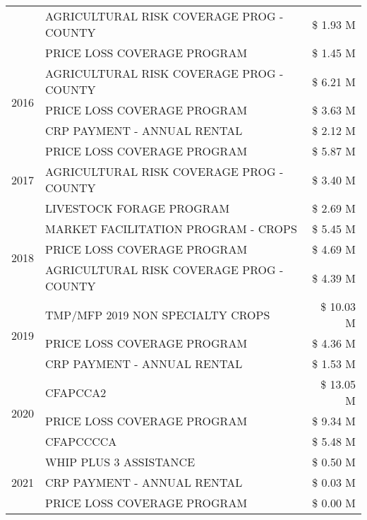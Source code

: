 \begin{tabular}{llr}
 & AGRICULTURAL RISK COVERAGE PROG - COUNTY & \$ 1.93 M \\
 & PRICE LOSS COVERAGE PROGRAM & \$ 1.45 M \\
\cline{1-3}
\multirow[t]{3}{*}{2016} & AGRICULTURAL RISK COVERAGE PROG - COUNTY & \$ 6.21 M \\
 & PRICE LOSS COVERAGE PROGRAM & \$ 3.63 M \\
 & CRP PAYMENT - ANNUAL RENTAL & \$ 2.12 M \\
\cline{1-3}
\multirow[t]{3}{*}{2017} & PRICE LOSS COVERAGE PROGRAM & \$ 5.87 M \\
 & AGRICULTURAL RISK COVERAGE PROG - COUNTY & \$ 3.40 M \\
 & LIVESTOCK FORAGE PROGRAM & \$ 2.69 M \\
\cline{1-3}
\multirow[t]{3}{*}{2018} & MARKET FACILITATION PROGRAM - CROPS & \$ 5.45 M \\
 & PRICE LOSS COVERAGE PROGRAM & \$ 4.69 M \\
 & AGRICULTURAL RISK COVERAGE PROG - COUNTY & \$ 4.39 M \\
\cline{1-3}
\multirow[t]{3}{*}{2019} & TMP/MFP 2019 NON SPECIALTY CROPS & \$ 10.03 M \\
 & PRICE LOSS COVERAGE PROGRAM & \$ 4.36 M \\
 & CRP PAYMENT - ANNUAL RENTAL & \$ 1.53 M \\
\cline{1-3}
\multirow[t]{3}{*}{2020} & CFAPCCA2 & \$ 13.05 M \\
 & PRICE LOSS COVERAGE PROGRAM & \$ 9.34 M \\
 & CFAPCCCCA & \$ 5.48 M \\
\cline{1-3}
\multirow[t]{3}{*}{2021} & WHIP PLUS 3 ASSISTANCE & \$ 0.50 M \\
 & CRP PAYMENT - ANNUAL RENTAL & \$ 0.03 M \\
 & PRICE LOSS COVERAGE PROGRAM & \$ 0.00 M \\
\cline{1-3}
\bottomrule
\end{tabular}
